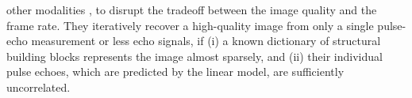 other modalities
\cite{article:ProvostITMI2009,article:ChenMedPhys2008,article:LustigMRM2007}, to disrupt
the tradeoff between
the image quality and
the frame rate.
They iteratively recover
a high-quality image from
only a single pulse-echo measurement or
less echo signals, if
(i) a known dictionary of
structural building blocks represents
the image almost sparsely, and
(ii) their individual pulse echoes, which are predicted by
the linear model, are
sufficiently uncorrelated.

